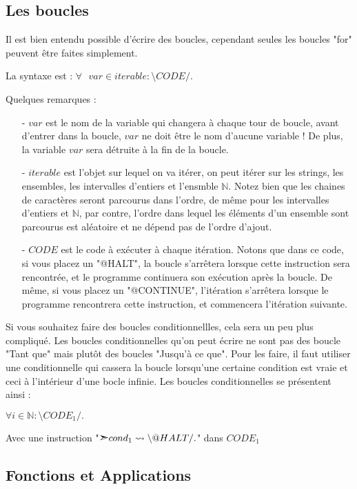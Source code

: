 \documentclass{article}
\newcommand{\bs}{\textbackslash}
\begin{document}
\subsection{Les boucles}
Il est bien entendu possible d'écrire des boucles, cependant seules les boucles "for" peuvent être faites simplement.

La syntaxe est : $\forall\text{ } var \in iterable : \text{\textbackslash} CODE /.$

Quelques remarques :
\begin{enumerate}
    \item[-] $var$ est le nom de la variable qui changera à chaque tour de boucle, avant d'entrer dans la boucle, $var$ ne doit être le nom d'aucune variable ! De plus, la variable $var$ sera détruite à la fin de la boucle. 
    \item[-] $iterable$ est l'objet sur lequel on va itérer, on peut itérer sur les strings, les ensembles, les intervalles d'entiers et l'ensmble $\mathbb{N}$.
    Notez bien que les chaines de caractères seront parcourus dans l'ordre, de même pour les intervalles d'entiers et $\mathbb{N}$, par contre, l'ordre dans lequel les éléments d'un ensemble sont parcourus est aléatoire et ne dépend pas de l'ordre d'ajout.
    \item[-] $CODE$ est le code à exécuter à chaque itération. Notons que dans ce code, si vous placez un "@HALT", la boucle s'arrêtera lorsque cette instruction sera rencontrée, et le programme continuera son exécution après la boucle. De même, si vous placez un "@CONTINUE", l'itération s'arrêtera lorsque le programme rencontrera cette instruction, et commencera l'itération suivante.
\end{enumerate}


Si vous souhaitez faire des boucles conditionnellles, cela sera un peu plus compliqué. Les boucles conditionnelles qu'on peut écrire ne sont pas des boucle "Tant que" mais plutôt des boucles "Jusqu'à ce que". Pour les faire, il faut utiliser une conditionnelle qui cassera la boucle lorsqu'une certaine condition est vraie et ceci à l'intérieur d'une bocle infinie. Les boucles conditionnelles se présentent ainsi :

$\forall i \in \mathbb{N} : \text{\bs } CODE_1 /. $

Avec une instruction "$\text{\ding{227}} cond_1 \leadsto \text{\textbackslash} @HALT/.$" dans $CODE_1$

\subsection{Fonctions et Applications}
\end{document}
